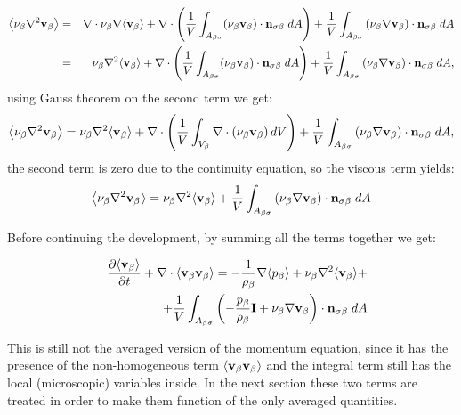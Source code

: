 \begin{eqnarray}
	{\left< \nu_{\beta}\nabla^2 \textbf{v}_{\beta}\right>} &=& \nabla \cdot \nu_{\beta} \nabla {\left< \textbf{v}_{\beta}\right>} + \nabla \cdot \left( \dfrac{1}{V} \int_{A_{\beta \sigma}}  (\nu_{\beta} \textbf{v}_{\beta}) \cdot \mathbf{n}_{\sigma \beta} \;dA \right) + \dfrac{1}{V} \int_{A_{\beta \sigma}} \left( \nu_{\beta} \nabla \textbf{v}_{\beta} \right) \cdot \mathbf{n}_{\sigma \beta} \;dA  \nonumber \\
	&=& \nu_{\beta}\nabla^2 {\left< \textbf{v}_{\beta} \right>} +  \nabla \cdot \left( \dfrac{1}{V} \int_{A_{\beta \sigma}}  (\nu_{\beta} \textbf{v}_{\beta}) \cdot \mathbf{n}_{\sigma \beta} \;dA \right) + \dfrac{1}{V} \int_{A_{\beta \sigma}} \left( \nu_{\beta} \nabla \textbf{v}_{\beta} \right) \cdot \mathbf{n}_{\sigma \beta} \;dA,   \nonumber
\end{eqnarray}
using Gauss theorem on the second term we get:
\begin{equation*}
	{\left< \nu_{\beta}\nabla^2 \textbf{v}_{\beta}\right>} = \nu_{\beta}\nabla^2 {\left< \textbf{v}_{\beta} \right>} +  \nabla \cdot \left( \dfrac{1}{V} \int_{V_\beta} \nabla \cdot \left( \nu_{\beta} \textbf{v}_{\beta} \right) dV \right) + \dfrac{1}{V} \int_{A_{\beta \sigma}} \left( \nu_{\beta} \nabla \textbf{v}_{\beta} \right) \cdot \mathbf{n}_{\sigma \beta} \;dA,  
\end{equation*}
the second term is zero due to the continuity equation, so the viscous term yields:
\begin{equation}
	{\left< \nu_{\beta}\nabla^2 \textbf{v}_{\beta}\right>} = \nu_{\beta}\nabla^2 {\left< \textbf{v}_{\beta} \right>} + \dfrac{1}{V} \int_{A_{\beta \sigma}} \left( \nu_{\beta} \nabla \textbf{v}_{\beta} \right) \cdot \mathbf{n}_{\sigma \beta} \;dA
\end{equation}


Before continuing the development, by summing all the terms together we get:

\begin{eqnarray}
&& \dfrac{\partial {\left< \textbf{v}_{\beta}\right>}}{\partial t} + \nabla \cdot {\left< \textbf{v}_{\beta}\textbf{v}_{\beta}\right>} = -\dfrac{1}{\rho_{\beta}} \nabla {\left< p_{\beta}\right>} + \nu_{\beta}\nabla^2 {\left< \textbf{v}_{\beta} \right>} + \nonumber \\
&& +\dfrac{1}{V} \int_{A_{\beta \sigma}} \left( -\dfrac{p_{\beta}}{\rho_{\beta}} \mathbf{I} + \nu_{\beta} \nabla \textbf{v}_{\beta}  \right)\cdot \mathbf{n}_{\sigma \beta} \;dA \nonumber \\
\label{eq:mom_2}
\end{eqnarray}

This is still not the averaged version of the momentum equation, since it has the presence of the non-homogeneous term ${\left< \textbf{v}_{\beta}\textbf{v}_{\beta} \right>}$ and the integral term still has the local (microscopic) variables inside.
In the next section these two terms are treated in order to make them function of the only averaged quantities.

